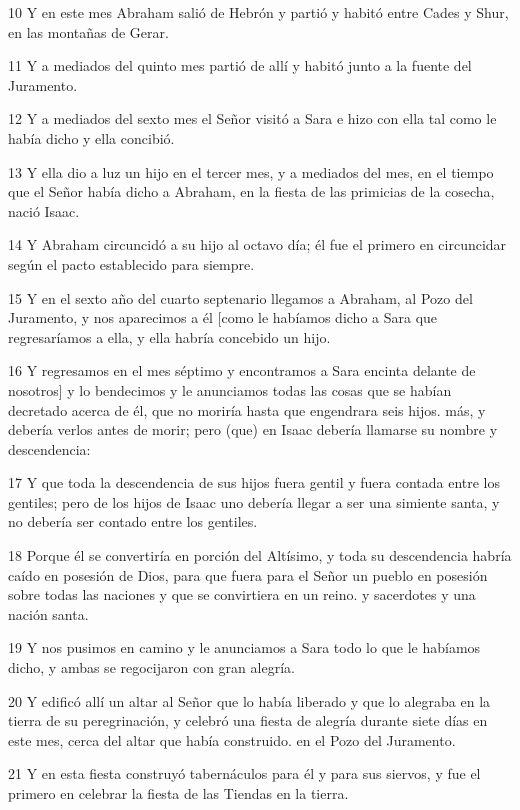 \par 10 Y en este mes Abraham salió de Hebrón y partió y habitó entre Cades y Shur, en las montañas de Gerar.
\par 11 Y a mediados del quinto mes partió de allí y habitó junto a la fuente del Juramento.
\par 12 Y a mediados del sexto mes el Señor visitó a Sara e hizo con ella tal como le había dicho y ella concibió.
\par 13 Y ella dio a luz un hijo en el tercer mes, y a mediados del mes, en el tiempo que el Señor había dicho a Abraham, en la fiesta de las primicias de la cosecha, nació Isaac.
\par 14 Y Abraham circuncidó a su hijo al octavo día; él fue el primero en circuncidar según el pacto establecido para siempre.
\par 15 Y en el sexto año del cuarto septenario llegamos a Abraham, al Pozo del Juramento, y nos aparecimos a él [como le habíamos dicho a Sara que regresaríamos a ella, y ella habría concebido un hijo.
\par 16 Y regresamos en el mes séptimo y encontramos a Sara encinta delante de nosotros] y lo bendecimos y le anunciamos todas las cosas que se habían decretado acerca de él, que no moriría hasta que engendrara seis hijos. más, y debería verlos antes de morir; pero (que) en Isaac debería llamarse su nombre y descendencia:
\par 17 Y que toda la descendencia de sus hijos fuera gentil y fuera contada entre los gentiles; pero de los hijos de Isaac uno debería llegar a ser una simiente santa, y no debería ser contado entre los gentiles.
\par 18 Porque él se convertiría en porción del Altísimo, y toda su descendencia habría caído en posesión de Dios, para que fuera para el Señor un pueblo en posesión sobre todas las naciones y que se convirtiera en un reino. y sacerdotes y una nación santa.
\par 19 Y nos pusimos en camino y le anunciamos a Sara todo lo que le habíamos dicho, y ambas se regocijaron con gran alegría.
\par 20 Y edificó allí un altar al Señor que lo había liberado y que lo alegraba en la tierra de su peregrinación, y celebró una fiesta de alegría durante siete días en este mes, cerca del altar que había construido. en el Pozo del Juramento.
\par 21 Y en esta fiesta construyó tabernáculos para él y para sus siervos, y fue el primero en celebrar la fiesta de las Tiendas en la tierra.
